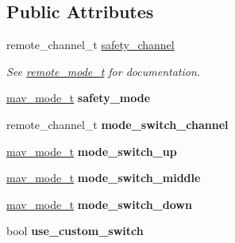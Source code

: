 \subsection*{Public Attributes}
\begin{DoxyCompactItemize}
\item 
\hypertarget{structremote__mode__conf__t_a566558933cf2fb56cafbaaf1e0b6a9d8}{remote\+\_\+channel\+\_\+t \hyperlink{structremote__mode__conf__t_a566558933cf2fb56cafbaaf1e0b6a9d8}{safety\+\_\+channel}}\label{structremote__mode__conf__t_a566558933cf2fb56cafbaaf1e0b6a9d8}

\begin{DoxyCompactList}\small\item\em See \hyperlink{structremote__mode__t}{remote\+\_\+mode\+\_\+t} for documentation. \end{DoxyCompactList}\item 
\hypertarget{structremote__mode__conf__t_ae7dec77e2007f2d1b6024d530f77a227}{\hyperlink{unionmav__mode__t}{mav\+\_\+mode\+\_\+t} {\bfseries safety\+\_\+mode}}\label{structremote__mode__conf__t_ae7dec77e2007f2d1b6024d530f77a227}

\item 
\hypertarget{structremote__mode__conf__t_a74e0a25e641a29717ff1ad30892eceaa}{remote\+\_\+channel\+\_\+t {\bfseries mode\+\_\+switch\+\_\+channel}}\label{structremote__mode__conf__t_a74e0a25e641a29717ff1ad30892eceaa}

\item 
\hypertarget{structremote__mode__conf__t_a907b32bb8f56d1d0b3d8c65b29570b4d}{\hyperlink{unionmav__mode__t}{mav\+\_\+mode\+\_\+t} {\bfseries mode\+\_\+switch\+\_\+up}}\label{structremote__mode__conf__t_a907b32bb8f56d1d0b3d8c65b29570b4d}

\item 
\hypertarget{structremote__mode__conf__t_a976b170e2f4dce7a144e567e4a2af480}{\hyperlink{unionmav__mode__t}{mav\+\_\+mode\+\_\+t} {\bfseries mode\+\_\+switch\+\_\+middle}}\label{structremote__mode__conf__t_a976b170e2f4dce7a144e567e4a2af480}

\item 
\hypertarget{structremote__mode__conf__t_a3a027a1f3f4dfc919216acb8d7fdd489}{\hyperlink{unionmav__mode__t}{mav\+\_\+mode\+\_\+t} {\bfseries mode\+\_\+switch\+\_\+down}}\label{structremote__mode__conf__t_a3a027a1f3f4dfc919216acb8d7fdd489}

\item 
\hypertarget{structremote__mode__conf__t_ad36fe3fbe163fff3b8ee6e61f80b2d12}{bool {\bfseries use\+\_\+custom\+\_\+switch}}\label{structremote__mode__conf__t_ad36fe3fbe163fff3b8ee6e61f80b2d12}


\end{DoxyCompactItemize}
